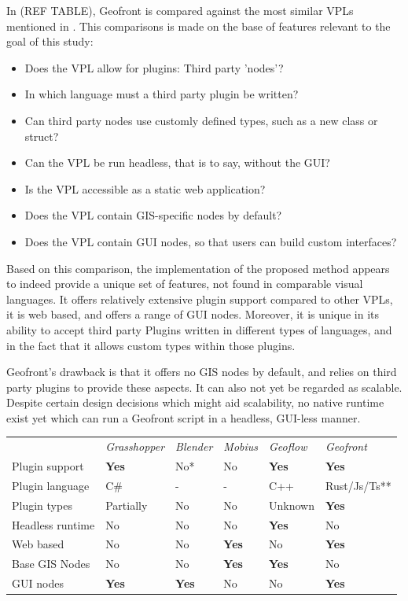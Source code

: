 In (REF TABLE), Geofront is compared against the most similar \ac{VPL}s mentioned in .
This comparisons is made on the base of features relevant to the goal of this study:
\begin{itemize}[-]
  \item Does the VPL allow for plugins: Third party 'nodes'?  
  \item In which language must a third party plugin be written?
  \item Can third party nodes use customly defined types, such as a new class or struct?
  \item Can the VPL be run headless, that is to say, without the \ac{GUI}?
  \item Is the VPL accessible as a static web application?
  \item Does the VPL contain GIS-specific nodes by default?
  \item Does the VPL contain \ac{GUI} nodes, so that users can build custom interfaces?
\end{itemize}

Based on this comparison, the implementation of the proposed method appears to indeed provide a unique set of features, not found in comparable visual languages. 
It offers relatively extensive plugin support compared to other VPLs, it is web based, and offers a range of \ac{GUI} nodes. 
Moreover, it is unique in its ability to accept third party Plugins written in different types of languages, and in the fact that it allows custom types within those plugins. 

Geofront's drawback is that it offers no GIS nodes by default, and relies on third party plugins to provide these aspects. 
It can also not yet be regarded as scalable. 
Despite certain design decisions which might aid scalability, no native runtime exist yet which can run a Geofront script in a headless, GUI-less manner.



\begin{tabular}{||p{2.8cm}|l|l|l|l|l||}
                  & \emph{Grasshopper} & \emph{Blender} & \emph{Mobius} & \emph{Geoflow}    & \emph{Geofront}   \\
Plugin support    & \textbf{Yes}  & No*    & No     & \textbf{Yes} & \textbf{Yes} \\
Plugin language   & C\#  & -    & -     & C++ & Rust/Js/Ts** \\
Plugin types      & Partially & No      & No     & Unknown    & \textbf{Yes} \\
Headless runtime  & No          & No      & No               & \textbf{Yes} & No         \\
Web based         & No          & No      & \textbf{Yes}     & No           & \textbf{Yes} \\
Base GIS Nodes    & No          & No      & \textbf{Yes}     & \textbf{Yes} & No \\
GUI nodes         & \textbf{Yes} & \textbf{Yes}      & No     & No          & \textbf{Yes} \\
\end{tabular}

